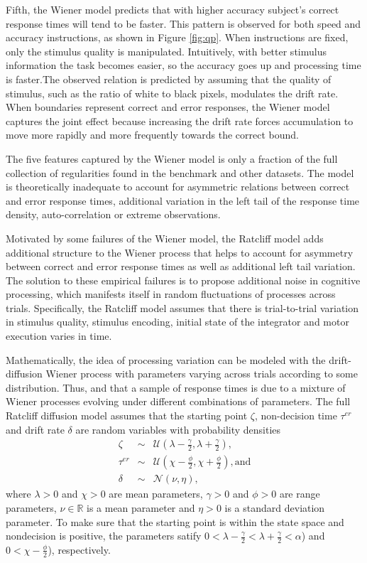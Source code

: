 \documentclass[12pt]{article}
\begin{document}
Fifth, the Wiener model predicts that with higher accuracy subject's correct response times will tend to be faster. 
This pattern is observed for both  speed and accuracy instructions, as shown in Figure \ref{fig:qp}. When instructions are fixed, only the stimulus quality is manipulated. Intuitively, with better stimulus information the task becomes easier, so the accuracy goes up and processing time is faster.The observed relation is predicted by assuming that the quality of stimulus, such as the ratio of white to black pixels, modulates the drift rate. When boundaries represent correct and error responses, the Wiener model captures the joint effect because increasing the drift rate forces accumulation to move more rapidly and more frequently towards the correct bound. 

The five features captured by the Wiener model is only a fraction of the full collection of regularities found in the benchmark and other datasets. The model is theoretically inadequate to account for asymmetric relations between correct and error response times, additional variation in the left tail of the response time density, auto-correlation or extreme observations. 
    
Motivated by some failures of the Wiener model, the Ratcliff model adds additional structure to the Wiener process that helps to account for asymmetry between correct and error response times as well as additional left tail variation. The solution to these empirical failures is to
propose additional noise in cognitive processing, which
manifests itself in random fluctuations of processes across
trials. Specifically, the Ratcliff model assumes that there is trial-to-trial variation in stimulus quality, stimulus encoding, initial state of the integrator and motor execution varies in time. 

Mathematically, the idea of processing variation can be modeled with the drift-diffusion Wiener process with
parameters varying across trials according to some distribution. Thus, and that a
sample of response times is due to a mixture of Wiener processes evolving under different combinations of parameters.
The full Ratcliff diffusion model
assumes that the starting point $\zeta$, non-decision time $\tau^{er}$ and drift rate $\delta$
are random variables with probability densities
%
\begin{eqnarray}
\zeta & \sim & \mathcal{U}(\lambda - \frac{\gamma}{2}, 
\lambda + \frac{\gamma}{2}), \nonumber \\
\tau^{er} & \sim & \mathcal{U}(\chi - \frac{\phi}{2}, 
\chi + \frac{\phi}{2}), \text{and} \nonumber \\
\delta & \sim & \mathcal{N}(\nu, \eta),
\end{eqnarray}
%
where $\lambda > 0$ and $\chi > 0$ are mean parameters, $\gamma > 0$ and $\phi >0$ are range parameters, $\nu \in \mathbb{R}$ is a mean parameter and $\eta > 0$ is a standard deviation parameter. To make sure that the starting point is within the state space and nondecision is positive, the parameters satify $0 < \lambda - \frac{\gamma}{2} < \lambda + \frac{\gamma}{2} < \alpha$) and $0 < \chi - \frac{\phi}{2}$), respectively.
\end{document}
